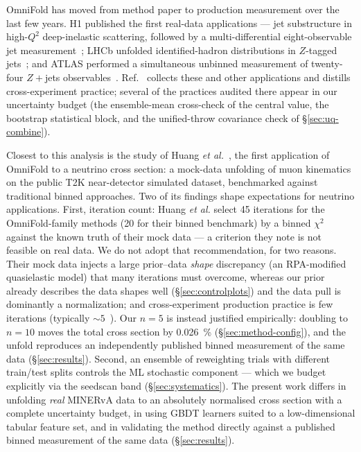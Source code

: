 OmniFold has moved from method paper to production measurement over the last
few years. H1 published the first real-data applications --- jet substructure
in high-$Q^{2}$ deep-inelastic scattering, followed by a multi-differential
eight-observable jet measurement~\cite{H1:2021wkz,H1:2023fzk}; LHCb unfolded
identified-hadron distributions in $Z$-tagged jets~\cite{LHCb:2022rky}; and
ATLAS performed a simultaneous unbinned measurement of twenty-four $Z+$jets
observables~\cite{ATLAS:2024jets}. Ref.~\cite{unbinnedguide} collects these
and other applications and distills cross-experiment practice; several of the
practices audited there appear in our uncertainty budget (the ensemble-mean
cross-check of the central value, the bootstrap statistical block, and the
unified-throw covariance check of \S\ref{sec:uq-combine}).

Closest to this analysis is the study of Huang \emph{et
al.}~\cite{Huang:2024omnifold}, the first application of OmniFold to a
neutrino cross section: a mock-data unfolding of muon kinematics on the
public T2K near-detector simulated dataset, benchmarked against traditional
binned approaches. Two of its findings shape expectations for neutrino
applications. First, iteration count: Huang \emph{et al.} select 45
iterations for the OmniFold-family methods (20 for their binned benchmark)
by a binned $\chi^{2}$ against the known truth of their mock data --- a
criterion they note is not feasible on real data. We do not adopt that
recommendation, for two reasons. Their mock data injects a large
prior--data \emph{shape} discrepancy (an RPA-modified quasielastic model)
that many iterations must overcome, whereas our prior already describes the
data shapes well (\S\ref{sec:controlplots}) and the data pull is dominantly
a normalization; and cross-experiment production practice is few iterations
(typically ${\sim}5$~\cite{unbinnedguide}). Our $n=5$ is instead justified
empirically: doubling to $n=10$ moves the total cross section by
\SI{0.026}{\percent} (\S\ref{sec:method-config}), and the unfold reproduces
an independently published binned measurement of the same data
(\S\ref{sec:results}). Second, an ensemble of reweighting trials with
different train/test splits controls the ML stochastic component --- which we
budget explicitly via the seedscan band (\S\ref{sec:systematics}). The
present work differs in unfolding \emph{real} MINERvA data to an absolutely
normalised cross section with a complete uncertainty budget, in using GBDT
learners suited to a low-dimensional tabular feature set, and in validating
the method directly against a published binned measurement of the same data
(\S\ref{sec:results}).


